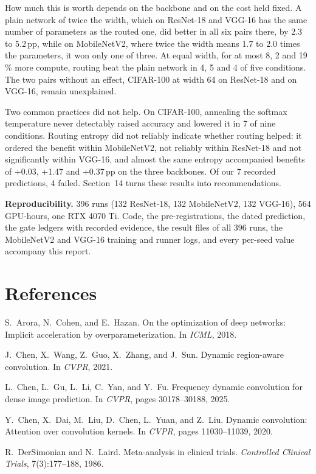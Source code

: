 \documentclass{article}
\begin{document}
How much this is worth depends on the backbone and on the cost held
fixed. A plain network of twice the width, which on ResNet-18 and VGG-16
has the same number of parameters as the routed one, did better in all six
pairs there, by 2.3 to 5.2\,pp, while on MobileNetV2, where
twice the width means 1.7 to 2.0 times the parameters, it
won only one of three. At equal width, for at most 8,
2 and 19\,\% more compute, routing beat the plain
network in 4, 5 and 4 of five conditions. The
two pairs without an effect, CIFAR-100 at width 64 on ResNet-18 and on
VGG-16, remain unexplained.

Two common practices did not help. On CIFAR-100, annealing the softmax
temperature never detectably raised accuracy and lowered it in
7 of nine conditions. Routing entropy did not reliably
indicate whether routing helped: it ordered the benefit within MobileNetV2,
not reliably within ResNet-18 and not significantly within VGG-16, and
almost the same entropy accompanied benefits of +0.03, +1.47 and
+0.37\,pp on the three backbones. Of our 7 recorded
predictions, 4 failed. Section~14 turns these
results into recommendations.

\textbf{Reproducibility.}  396 runs (132 ResNet-18,
132 MobileNetV2, 132 VGG-16), 564 GPU-hours, one
RTX 4070 Ti. Code, the pre-registrations, the dated prediction, the gate
ledgers with recorded evidence, the result files of all 396 runs,
the MobileNetV2 and VGG-16 training and runner logs, and every per-seed
value accompany this report.


\section*{References}

S.~Arora, N.~Cohen, and E.~Hazan. On the optimization of deep networks: Implicit acceleration by overparameterization. In \emph{ICML}, 2018.

J.~Chen, X.~Wang, Z.~Guo, X.~Zhang, and J.~Sun. Dynamic region-aware convolution. In \emph{CVPR}, 2021.

L.~Chen, L.~Gu, L.~Li, C.~Yan, and Y.~Fu. Frequency dynamic convolution for dense image prediction. In \emph{CVPR}, pages 30178--30188, 2025.

Y.~Chen, X.~Dai, M.~Liu, D.~Chen, L.~Yuan, and Z.~Liu. Dynamic convolution: Attention over convolution kernels. In \emph{CVPR}, pages 11030--11039, 2020.

R.~DerSimonian and N.~Laird. Meta-analysis in clinical trials. \emph{Controlled Clinical Trials}, 7(3):177--188, 1986.
\end{document}
